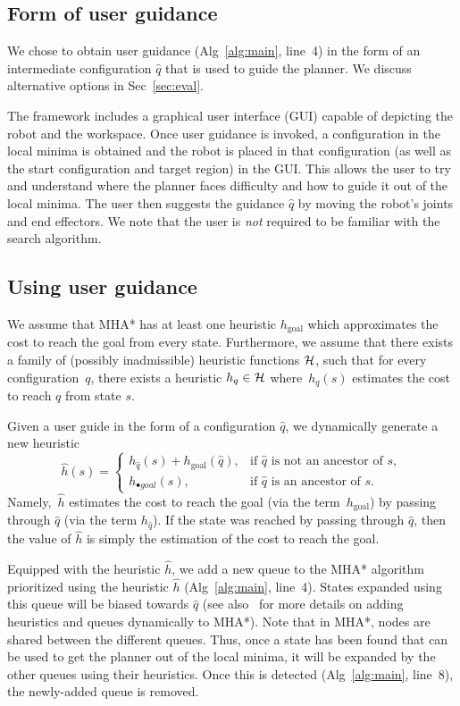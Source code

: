 \documentclass[conference]{IEEEtran}
\begin{document}
\subsection{Form of user guidance}
\label{sec:q2}
We chose to obtain user guidance 
(Alg~\ref{alg:main}, line~4)
in the form of an intermediate configuration $\hat{q}$ that is used to guide the planner. We discuss alternative options in Sec~\ref{sec:eval}.

The framework includes a graphical user interface (GUI) capable of  depicting the robot and the workspace.
Once user guidance is invoked, 
a configuration in the local minima is obtained and the robot is placed in that configuration (as well as the start configuration and target region) in the GUI.
This allows the user to try and understand where the planner faces difficulty and how to guide it out of the local minima.
The user then suggests the guidance $\hat{q}$ by moving the robot's joints and end effectors.
We note that the user is \emph{not} required to be familiar with the search algorithm.

\subsection{Using user guidance}
\label{sec:q3}
We assume that MHA* has at least one heuristic $h_{\text{goal}}$ which approximates the cost to reach the goal from every state.
Furthermore, we assume that there exists a family of (possibly inadmissible) heuristic functions $\mathcal{H}$, such that for every configuration~$q$, there exists a heuristic $h_q \in \mathcal{H}$ where~$h_q(s)$ estimates the cost to reach $q$ from state $s$.

Given a user guide in the form of a configuration $\hat{q}$, we dynamically generate a new heuristic $$
    \hat{h}(s)= 
\begin{cases}
    h_{\hat{q}}(s) + h_{\text{goal}}(\hat{q}),	& 
    		\text{if } \hat{q} \text{ is not an ancestor of } s,\\
    h_{\textbf{•}{goal}}(s),            		& 
    		\text{if } \hat{q} \text{ is an ancestor of } s.
\end{cases}
$$
Namely,~$\hat{h}$ estimates the 
cost to reach the goal (via the term~$h_{\text{goal}}$) by passing through $\hat{q}$ (via the term $h_{\hat{q}}$). If the state was reached by passing through $\hat{q}$, then the value of $\hat{h}$ is simply the estimation of the cost to reach the goal.


Equipped with the heuristic $\hat{h}$, we add a new queue to the MHA* algorithm prioritized using the heuristic $\hat{h}$ (Alg~\ref{alg:main}, line~4). 
States expanded using this queue will be biased towards $\hat{q}$ (see also~\cite{INL15} for more details on adding heuristics and queues dynamically to MHA*).
Note that in MHA*, nodes are shared between the different queues.
Thus, once a state has been found that can be used to get the planner out of the local minima, it will be expanded by the other queues using their heuristics.
Once this is detected (Alg~\ref{alg:main}, line~8), the newly-added queue is removed.
\end{document}
